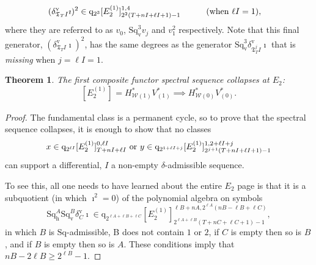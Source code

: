 \documentclass[11pt]{amsart} \renewcommand{\baselinestretch}{1.4}
\theoremstyle{plain}
\newtheorem{thm}{Theorem}[section]
\theoremstyle{definition}
\newcommand{\calw}{\mathcal{W}}
\newcommand{\quadgrad}[1]{\mathrm{q}_{#1}}
\newcommand{\Sq}{\mathrm{Sq}}
\newcommand{\TOP}{\mathfrak{T}}
\newcommand{\E}[5]{[E^{#1}_{#2}#3]^{#4}_{#5}}
\newcommand{\uver}{^\mathrm{v}}
\newcommand{\dver}{_\mathrm{v}}
\newcommand{\dhor}{_\mathrm{h}}
\newcommand{\Sqh}{\mathrm{Sq}\dhor}
\newcommand{\Sqv}{\mathrm{Sq}\dver}
\newcommand{\deltav}{\delta\uver}
\begin{document}
\begin{Calculations of HWn for n nonzero}
\begin{alignat}{2}
(\deltav_{\TOP_T I}\imath)^{2}&\in 
\quadgrad{2^{3}}\E{(1)}{2}{}{1,4}{2^{2}(T+nI+\ell I+1)-1}
&\qquad&\textup{(when $\ell I=1$)},
\label{last generator}
\end{alignat}
where they are referred to  as $v_0$, $\Sqv^3v_j$ and $v_1^2$ respectively.
Note that this final generator, $(\deltav_{\TOP_T I}\imath)^{2}$, has the same degrees as the generator $\Sqv^{3}\deltav_{\TOP_T^j\!I}\imath$ that is \emph{missing} when $j=\ell I=1$.
\begin{thm}
The first composite functor spectral sequence collapses at $E_2$:
\[\E{(1)}{2}{}{}{}=H^*_{\calw(1)}V^*_{(1)}\implies H^*_{\calw(0)}V^*_{(0)}.\]
\end{thm}
\begin{proof}
The fundamental class is a permanent cycle, so to prove that the spectral sequence collapses, it is enough to show that no classes
\[x\in \quadgrad{2^{\ell I}}\E{(1)}{2}{}{0,\ell I}{T+nI+\ell I}\textup{ or }y\in \quadgrad{2^{1+\ell I+j}}\E{(1)}{2}{}{1,2+\ell I+j}{2^{j+1}(T+nI+\ell I+1)-1}\]
can support a differential, $I$ a non-empty $\delta$-admissible sequence.

To see this, all one needs to have learned about the entire $E_2$ page is that it is a subquotient (in which $\imath^2=0$) of the polynomial algebra on symbols
\[\Sqh^A\Sqv^B\deltav_C\imath\in \quadgrad{2^{\ell A+\ell B+\ell C}}\E{(1)}{2}{}{\ell B+nA,2^{\ell A}(nB-\ell B+\ell C)}{2^{\ell A+\ell B}(T+nC+\ell C+1)-1},\]
in which $B$ is $\Sq$-admissible, B does not contain $1$ or $2$, if $C$ is empty then so is $B$, and if $B$ is empty then so is $A$. These conditions imply that $nB-2\ell B\geq2^{\ell B}-1$.  %


\end{proof}
\end{Calculations of HWn for n nonzero}
\end{document}

